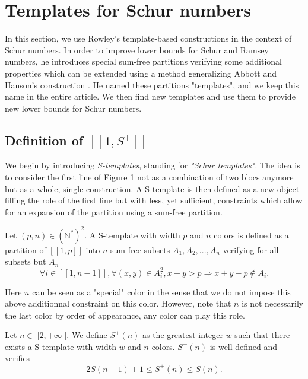 \section{Templates for Schur numbers}
\label{Schur}

In this section, we use Rowley's template-based constructions \cite{RowleyRamsey} in the context of Schur 
numbers. In order to improve lower bounds for Schur and Ramsey numbers, he introduces special sum-free 
partitions verifying some additional properties which can be extended using a method generalizing Abbott and 
Hanson's construction \cite{AbbottHanson}. He named these partitions "templates", and we keep this name in 
the entire article. We then find new templates and use them to provide new lower bounds for Schur numbers.

\subsection{Definition of \( [\![ 1, S^+ ]\!] \)}

We begin by introducing \textit{S-templates}, standing for \textit{"Schur templates"}. The idea is to consider the first line
of \hyperref[figure:1]{Figure 1} not as a combination of two blocs anymore but as a whole, single construction. A S-template 
is then defined as a new object filling the role of the first line but with less, yet sufficient, constraints which allow for an 
expansion of the partition using a sum-free partition.

\begin{definition}
Let \((p,n) \in (\mathbb{N}^*)^2\). A S-template with width \(p\) and \(n\) colors is defined as a partition of 
\([\![1,p]\!]\) into \(n\) sum-free subsets \(A_1, A_2, ..., A_n\) verifying for all subsets but \(A_n\)
\[
\forall i \in [\![1, n-1]\!], \forall (x,y) \in A_i^2, x+y > p
\Longrightarrow x+y-p \notin A_i.
\]
\end{definition}

Here \(n\) can be seen as a "special" color in the sense that we do not impose this above additionnal constraint on this color. 
However, note that \(n\) is not necessarily the last color by order of appearance, any color can play this role.


\begin{proposition}
	Let \(n \in [\![2, +\infty[\![\). We define \(S^+(n)\) as the greatest integer \(w\) such that there exists a S-template with 
	width \(w\) and \(n\) colors. 
	\(S^+(n)\) is well defined and verifies
	\[
	2S(n-1)+1 \leqslant S^+(n) \leqslant S(n).
	\]
\end{proposition}


